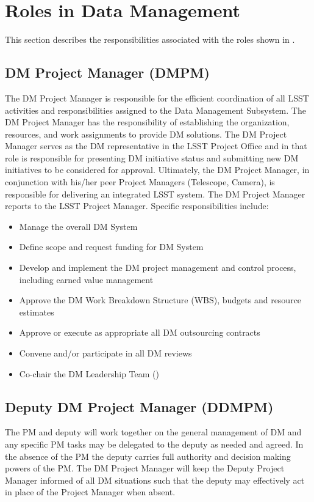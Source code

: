 \section{Roles in Data Management}

This section describes the responsibilities associated with the roles shown in
.


\subsection{DM Project Manager (DMPM)\label{role:dmpm}}

The DM Project Manager is responsible for the efficient coordination of all LSST activities and responsibilities assigned to the Data Management Subsystem. The DM Project Manager has the responsibility of establishing the organization, resources, and work assignments to provide DM solutions.  The DM Project Manager serves as the DM representative in the LSST Project Office and in that role is responsible for presenting DM initiative status and submitting new DM initiatives to be considered for approval. Ultimately, the DM Project Manager, in conjunction with his/her peer Project Managers (Telescope, Camera), is responsible for delivering an integrated LSST system. The DM Project Manager reports to the LSST Project Manager. Specific responsibilities include:

\begin{itemize}
\item Manage the overall DM System
\item Define scope and request funding for DM System
\item Develop and implement the DM project management and control process, including earned value management
\item Approve the DM Work Breakdown Structure (WBS), budgets and resource estimates
\item Approve or execute as appropriate all DM outsourcing contracts
\item Convene and/or participate in all DM reviews
\item Co-chair the DM Leadership Team ()
\end{itemize}

\subsection{Deputy DM Project Manager (DDMPM) \label{role:ddmpm}}
The PM and deputy will work together on the general management of DM and any specific PM tasks may be delegated to the deputy as needed and agreed. In the absence of the PM the deputy carries full authority and decision making powers of the PM. The DM Project Manager will keep the Deputy Project Manager informed of all DM situations such that the deputy may effectively act in place of the Project Manager when absent.

